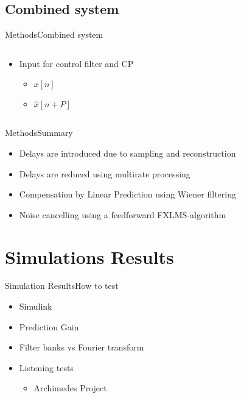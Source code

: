 \subsection{Combined system}
\begin{frame}{Methods}{Combined system}	
\begin{columns}
	\begin{column}{0.4\textwidth}
		\begin{itemize}
			\item Input for control filter and CP
			\vspace{-4mm}
			\begin{itemize}
			\item $x[n]$
			\item $\hat{x}[n+P]$
			\end{itemize}
		\end{itemize}
	\end{column}
	\begin{column}{0.6\textwidth} 
		\resizebox{0.9\columnwidth}{!}{		
			}
	\end{column}
\end{columns}
\end{frame}





\begin{frame}{Methods}{Summary}	
\begin{itemize}
	\item Delays are introduced due to sampling and reconstruction
	\item Delays are reduced using multirate processing
	\item Compensation by Linear Prediction using Wiener filtering
	\item Noise cancelling using a feedforward FXLMS-algorithm
\end{itemize}
\end{frame}










\section{Simulations Results}


\begin{frame}{Simulation Results}{How to test}	
\begin{itemize}
	\item Simulink 
	\item Prediction Gain
	\item Filter banks vs Fourier transform
	\item Listening tests
			\begin{itemize}
				\item Archimedes Project
			\end{itemize}
\end{itemize}
\end{frame}

